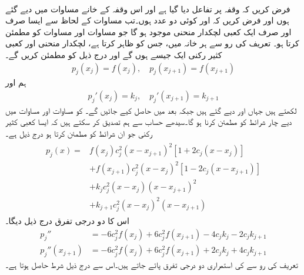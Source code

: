 \quad {}\\
فرض کریں کہ وقفہ  پر تفاعل  دیا گیا ہے اور اس وقفہ کے خانے مساوات  میں دیے گئے ہوں اور فرض کریں کہ  اور  کوئی دو عدد ہوں۔تب مساوات  کے لحاظ سے ایسا صرف اور صرف ایک کعبی لچکدار منحنی  موجود ہو گا جو مساوات  اور مساوات  کو مطمئن کرتا ہو۔
\quad
تعریف کی رو سے ہر خانہ  میں، جس کو  ظاہر کرتا ہے، لچکدار منحنی   اور کعبی کثیر رکنی  ایک جیسے ہوں گے اور درج ذیل کو مطمئن کریں گے۔
\begin{align}\label{مساوات_اعدادی_لچکدار_منحنی_ٹکڑے_ت}
p_j(x_j)=f(x_j),\quad p_j(x_{j+1})=f(x_{j+1})
\end{align}
ہم  اور
\begin{align}\label{مساوات_اعدادی_لچکدار_منحنی_ٹکڑے_ٹ}
p_j'(x_j)=k_j,\quad p_j'(x_{j+1})=k_{j+1}
\end{align}
لکھتے ہیں جہاں  اور  دیے گئے ہیں جبکہ  بعد میں حاصل کیے جائیں گے۔ کو مساوات  اور مساوات  میں دیے چار شرائط کو مطمئن کرنا ہو گا۔سیدھے حساب سے ہم تصدیق کر سکتے ہیں کہ ایسا کعبی کثیر رکنی  جو ان شرائط کو مطمئن کرتا ہو درج ذیل ہے۔
\begin{gather}
\begin{aligned}\label{مساوات_اعدادی_لچکدار_منحنی_ٹکڑے_ث}
p_j(x)=&f(x_j)c_j^2(x-x_{j+1})^2[1+2c_j(x-x_j)]\\
&+f(x_{j+1})c_j^2(x-x_j)^2[1-2c_j(x-x_{j+1})]\\
&+k_jc_j^2(x-x_j)(x-x_{j+1})^2\\
&+k_{j+1}c_j^2(x-x_j)^2(x-x_{j+1})
\end{aligned}
\end{gather}
اس کا دو درجی تفرق درج ذیل دیگا۔
\begin{align}
p_j''&=-6c_j^2f(x_j)+6c_j^2f(x_{j+1})-4c_jk_j-2c_jk_{j+1}\label{مساوات_اعدادی_دو_درجی_تفرق_الف}\\
p_j''(x_{j+1})&=-6c_j^2f(x_j)+6c_j^2f(x_{j+1})+2c_jk_j+4c_jk_{j+1}\label{مساوات_اعدادی_دو_درجی_تفرق_ب}
\end{align}
تعریف کی رو سے  کی استمراری دو درجی تفرق پائے جاتے ہیں۔اس سے درج ذیل شرط حاصل ہوتا ہے۔
